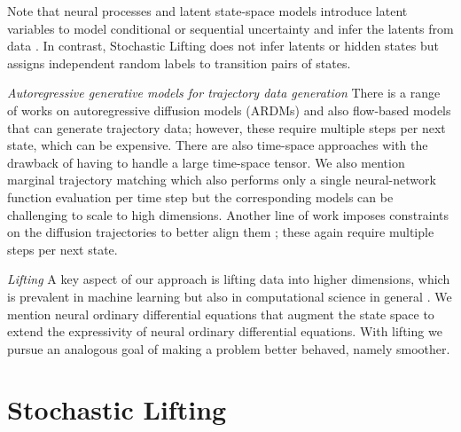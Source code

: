 \documentclass{article}
\theoremstyle{plain}
\theoremstyle{definition}
\theoremstyle{remark}
\begin{document}
Note that neural processes and latent state-space models introduce latent variables to model conditional or sequential uncertainty and infer the latents from data \cite{10.5555/3298483.3298543,pmlr-v80-garnelo18a}. In contrast, Stochastic Lifting does not infer latents or hidden states but assigns independent random labels to transition pairs of states.


\emph{Autoregressive generative models for trajectory data generation} There is a range of works on autoregressive diffusion models (ARDMs) \cite{hoogeboom2021autoregressive,albergo2023stochastic,Price2025} and also flow-based models \cite{davtyan2023efficientRIVER, chen2024probabilistic} that can generate trajectory data; however, these require multiple steps per next state, which can be expensive. There are also time-space approaches \cite{ho2022video} with the drawback of having to handle a large time-space tensor. We also mention marginal trajectory matching \cite{neklyudov2023action, berman2024parametric,blickhan2025dicediscreteinversecontinuity} which also performs only a single neural-network function evaluation per time step but the corresponding models can be challenging to scale to high dimensions. Another line of work imposes constraints on the diffusion trajectories to better align them \cite{ruhling2023dyffusion,ruhe2024rolling}; these again require multiple steps per next state.

\emph{Lifting} A key aspect of our approach is lifting data into higher dimensions, which is prevalent in machine learning \cite{Cortes1995,NIPS2007_013a006f} but also in computational science in general \cite{mccormick1976computability,5991229,kramer2019nonlinear,qian2020lift,doi:10.1080/03036758.2020.1863237}. We mention neural ordinary differential equations \cite{dupont2019augmented, kidger2022OnNeuralODEs} that augment the state space to extend the expressivity of neural ordinary differential equations. With lifting we pursue an analogous goal of making a problem better behaved, namely smoother.


\section{Stochastic Lifting}
\end{document}
